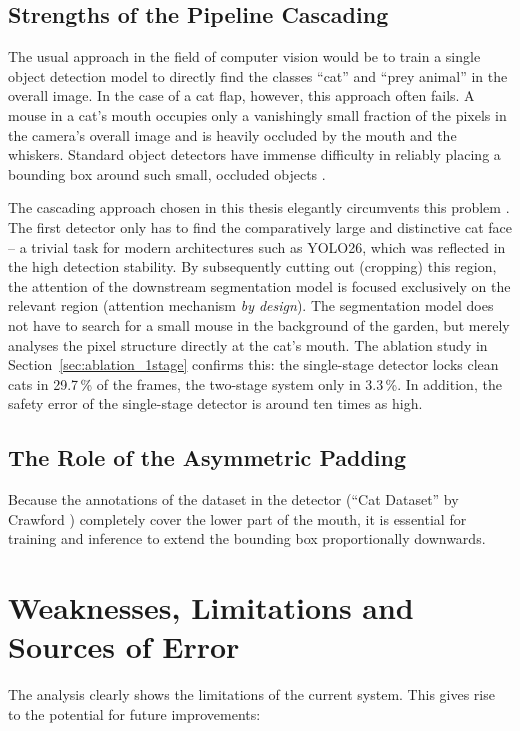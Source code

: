 \subsection{Strengths of the Pipeline Cascading}
The usual approach in the field of computer vision would be to train a single object detection model to directly find the classes ``cat'' and ``prey animal'' in the overall image. In the case of a cat flap, however, this approach often fails. A mouse in a cat's mouth occupies only a vanishingly small fraction of the pixels in the camera's overall image and is heavily occluded by the mouth and the whiskers. Standard object detectors have immense difficulty in reliably placing a bounding box around such small, occluded objects \cite{tong2020small}.

The cascading approach chosen in this thesis elegantly circumvents this problem \cite{baumann2020smartcatflap, zhang2014partbased}. The first detector only has to find the comparatively large and distinctive cat face -- a trivial task for modern architectures such as YOLO26, which was reflected in the high detection stability. By subsequently cutting out (cropping) this region, the attention of the downstream segmentation model is focused exclusively on the relevant region (attention mechanism \textit{by design}). The segmentation model does not have to search for a small mouse in the background of the garden, but merely analyses the pixel structure directly at the cat's mouth. The ablation study in Section~\ref{sec:ablation_1stage} confirms this: the single-stage detector locks clean cats in 29.7\,\% of the frames, the two-stage system only in 3.3\,\%. In addition, the safety error of the single-stage detector is around ten times as high.

\subsection{The Role of the Asymmetric Padding}
Because the annotations of the dataset in the detector (``Cat Dataset'' by Crawford \cite{kaggle2024cat}) completely cover the lower part of the mouth, it is essential for training and inference to extend the bounding box proportionally downwards.

\section{Weaknesses, Limitations and Sources of Error}
The analysis clearly shows the limitations of the current system. This gives rise to the potential for future improvements:

